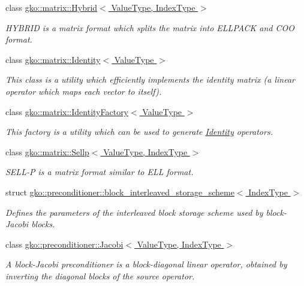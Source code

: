 \begin{DoxyCompactItemize}
class \hyperlink{classgko_1_1matrix_1_1Hybrid}{gko\+::matrix\+::\+Hybrid$<$ Value\+Type, Index\+Type $>$}
\begin{DoxyCompactList}\small\item\em H\+Y\+B\+R\+ID is a matrix format which splits the matrix into E\+L\+L\+P\+A\+CK and C\+OO format. \end{DoxyCompactList}\item 
class \hyperlink{classgko_1_1matrix_1_1Identity}{gko\+::matrix\+::\+Identity$<$ Value\+Type $>$}
\begin{DoxyCompactList}\small\item\em This class is a utility which efficiently implements the identity matrix (a linear operator which maps each vector to itself). \end{DoxyCompactList}\item 
class \hyperlink{classgko_1_1matrix_1_1IdentityFactory}{gko\+::matrix\+::\+Identity\+Factory$<$ Value\+Type $>$}
\begin{DoxyCompactList}\small\item\em This factory is a utility which can be used to generate \hyperlink{classgko_1_1matrix_1_1Identity}{Identity} operators. \end{DoxyCompactList}\item 
class \hyperlink{classgko_1_1matrix_1_1Sellp}{gko\+::matrix\+::\+Sellp$<$ Value\+Type, Index\+Type $>$}
\begin{DoxyCompactList}\small\item\em S\+E\+L\+L-\/P is a matrix format similar to E\+LL format. \end{DoxyCompactList}\item 
struct \hyperlink{structgko_1_1preconditioner_1_1block__interleaved__storage__scheme}{gko\+::preconditioner\+::block\+\_\+interleaved\+\_\+storage\+\_\+scheme$<$ Index\+Type $>$}
\begin{DoxyCompactList}\small\item\em Defines the parameters of the interleaved block storage scheme used by block-\/\+Jacobi blocks. \end{DoxyCompactList}\item 
class \hyperlink{classgko_1_1preconditioner_1_1Jacobi}{gko\+::preconditioner\+::\+Jacobi$<$ Value\+Type, Index\+Type $>$}
\begin{DoxyCompactList}\small\item\em A block-\/\+Jacobi preconditioner is a block-\/diagonal linear operator, obtained by inverting the diagonal blocks of the source operator. \end{DoxyCompactList}\item 

\end{DoxyCompactItemize}
